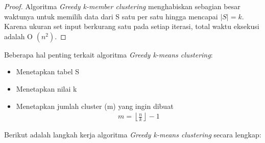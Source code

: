 \begin{proof}
Algoritma \textit{Greedy k-member clustering} menghabiskan sebagian besar waktunya untuk memilih data dari S satu per satu hingga mencapai $|S| = k$. Karena ukuran set input berkurang satu pada setiap iterasi, total waktu eksekusi adalah O $(n^2)$.
\end{proof}

\noindent Beberapa hal penting terkait algoritma \textit{Greedy k-means clustering}:

\begin{itemize}
\item Menetapkan tabel S  
\item Menetapkan nilai k
\item Menetapkan jumlah cluster (m) yang ingin dibuat
\begin{align}
m = \left \lfloor \frac{n}{k} \right \rfloor - 1
\end{align}
\end{itemize}


\noindent Berikut adalah langkah kerja algoritma \textit{Greedy k-means clustering} secara lengkap:

